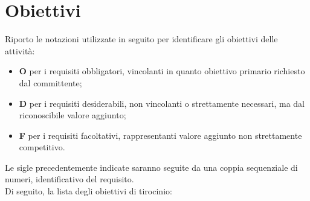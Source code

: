 \section{Obiettivi}

Riporto le notazioni utilizzate in seguito per identificare gli obiettivi delle attività:
\begin{itemize}
    \item \textbf{O} per i requisiti obbligatori, vincolanti in quanto obiettivo primario richiesto dal committente;
    \item \textbf{D} per i requisiti desiderabili, non vincolanti o strettamente necessari, ma dal riconoscibile valore aggiunto;
    \item \textbf{F} per i requisiti facoltativi, rappresentanti valore aggiunto non strettamente competitivo.
\end{itemize}
Le sigle precedentemente indicate saranno seguite da una coppia sequenziale di numeri, identificativo del requisito. \\
Di seguito, la lista degli obiettivi di tirocinio:
